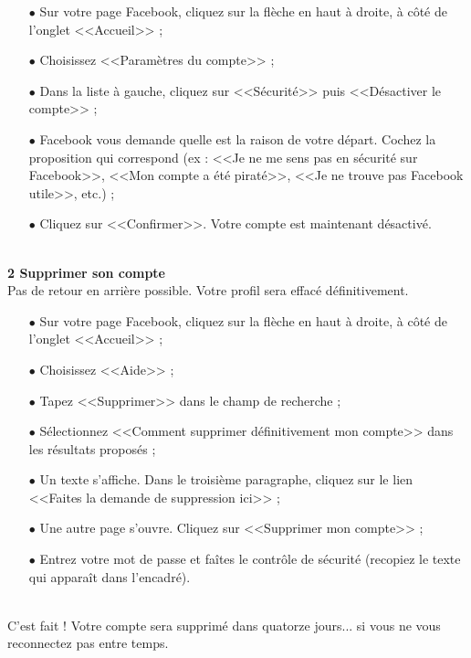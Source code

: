 \documentclass[11pt,twoside,a4paper]{article}
\begin{document}
\begin{itemize}
	\item[$\bullet$] Sur votre page Facebook, cliquez sur la fl{\`e}che en haut {\`a} droite, {\`a} c{\^o}t{\'e} de l'onglet <<Accueil>> ;
	\item[$\bullet$] Choisissez <<Param{\`e}tres du compte>> ;
	\item[$\bullet$] Dans la liste {\`a} gauche, cliquez sur <<S{\'e}curit{\'e}>> puis <<D{\'e}sactiver le compte>> ;
	\item[$\bullet$] Facebook vous demande quelle est la raison de votre d{\'e}part. Cochez la proposition qui correspond (ex : <<Je ne me sens pas en s{\'e}curit{\'e} sur Facebook>>, <<Mon compte a {\'e}t{\'e} pirat{\'e}>>, <<Je ne trouve pas Facebook utile>>, etc.) ;
	\item[$\bullet$] Cliquez sur <<Confirmer>>. Votre compte est maintenant d{\'e}sactiv{\'e}.
\end{itemize}~\\

\textbf{2 Supprimer son compte}~\\

Pas de retour en arri{\`e}re possible. Votre profil sera effac{\'e} d{\'e}finitivement. ~\\

\begin{itemize}
	\item[$\bullet$] Sur votre page Facebook, cliquez sur la fl{\`e}che en haut {\`a} droite, {\`a} c{\^o}t{\'e} de l'onglet <<Accueil>> ;
	\item[$\bullet$] Choisissez <<Aide>> ;
	\item[$\bullet$] Tapez <<Supprimer>> dans le champ de recherche ;
	\item[$\bullet$] S{\'e}lectionnez <<Comment supprimer d{\'e}finitivement mon compte>> dans les r{\'e}sultats propos{\'e}s ;
	\item[$\bullet$] Un texte s'affiche. Dans le troisi{\`e}me paragraphe, cliquez sur le lien <<Faites la demande de suppression ici>> ;
	\item[$\bullet$] Une autre page s'ouvre. Cliquez sur <<Supprimer mon compte>> ;
	\item[$\bullet$] Entrez votre mot de passe et fa{\^i}tes le contr{\^o}le de s{\'e}curit{\'e} (recopiez le texte qui appara{\^i}t dans l'encadr{\'e}).
\end{itemize}~\\

C'est fait ! Votre compte sera supprim{\'e} dans quatorze jours... si vous ne vous reconnectez pas entre temps. ~\\
\end{document}
